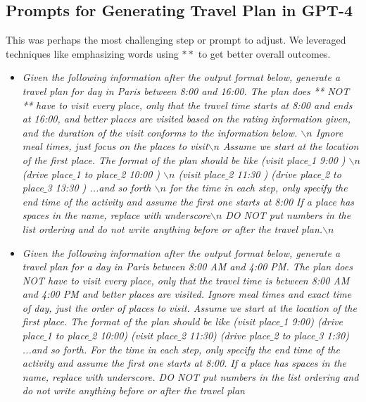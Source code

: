 \documentclass[doubleblind]{ecai}
\newcommand{\gpt}{{\sc GPT-4}\xspace}
\begin{document}

\subsection{Prompts for Generating Travel Plan in \gpt}

This was perhaps the most challenging step or prompt to adjust. We leveraged techniques like emphasizing words using $**$ to get better overall outcomes. 

\begin{itemize}
    \item \textit{Given the following information after the output format below, generate a travel plan for day in Paris
         between  8:00 and 16:00.
         The plan does ** NOT ** have to visit every place, only that the travel time starts at  8:00 and ends at 16:00, 
         and better places are visited based on the rating information given, and the duration of the visit conforms to the information below. $\backslash{n}$
         Ignore meal times, just focus on the places to visit$\backslash{n}$
         Assume we start at the location of the first place. The format of the plan should be like
         (visit place$\_$1 9:00 ) $\backslash{n}$ (drive place$\_$1 to place$\_$2 10:00 ) $\backslash{n}$ (visit place$\_$2 11:30 ) (drive place$\_$2 to place$\_$3 13:30 ) ...and so forth $\backslash{n}$ 
         for the time in each step, only specify the end time of the activity and assume the first one starts at 8:00 
         If a place has spaces in the name, replace with underscore$\backslash{n}$          
         DO NOT put numbers in the list ordering and do not write anything before or after the travel plan.$\backslash{n}$}
         
    \item \textit{Given the following information after the output format below, generate a travel plan for a day in Paris between 8:00 AM and 4:00 PM. The plan does NOT have to visit every place, only that the travel time is between 8:00 AM and 4:00 PM and better places are visited. Ignore meal times and exact time of day, just the order of places to visit.
    Assume we start at the location of the first place. The format of the plan should be like (visit place$\_$1 9:00) (drive place$\_$1 to place$\_$2 10:00) (visit place$\_$2 11:30) (drive place$\_$2 to place$\_$3 1:30) ...and so forth. For the time in each step, only specify the end time of the activity and assume the first one starts at 8:00. If a place has spaces in the name, replace with underscore. DO NOT put numbers in the list ordering and do not write anything before or after the travel plan}
   
\end{itemize}
\end{document}
